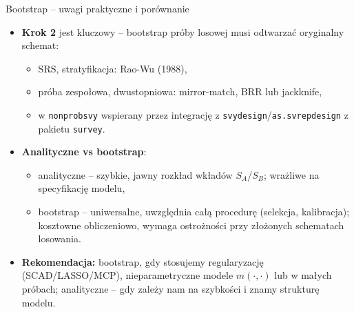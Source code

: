 \documentclass[10pt,ignorenonframetext, aspectratio=169]{beamer}
\begin{document}
\begin{frame}{Bootstrap -- uwagi praktyczne i porównanie}
\begin{itemize}
\justifying
    \item \textbf{Krok 2} jest kluczowy -- bootstrap próby losowej musi odtwarzać oryginalny schemat:
    \begin{itemize}
        \item SRS, stratyfikacja: Rao-Wu (1988),
        \item próba zespołowa, dwustopniowa: mirror-match, BRR lub jackknife,
        \item w \texttt{nonprobsvy} wspierany przez integrację z \texttt{svydesign}/\texttt{as.svrepdesign} z pakietu \texttt{survey}.
    \end{itemize}
    \item \textbf{Analityczne vs bootstrap}:
    \begin{itemize}
        \item analityczne -- szybkie, jawny rozkład wkładów $S_A$/$S_B$; wrażliwe na specyfikację modelu,
        \item bootstrap -- uniwersalne, uwzględnia całą procedurę (selekcja, kalibracja); kosztowne obliczeniowo, wymaga ostrożności przy złożonych schematach losowania.
    \end{itemize}
    \item \textbf{Rekomendacja:} bootstrap, gdy stosujemy regularyzację (SCAD/LASSO/MCP), nieparametryczne modele $m(\cdot, \cdot)$ lub w małych próbach; analityczne -- gdy zależy nam na szybkości i znamy strukturę modelu.
\end{itemize}
\end{frame}
\end{document}
